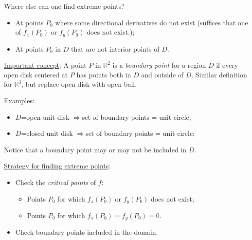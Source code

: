 \begin{frame}
  \frametitle{}

Where else can one find extreme points?\pause

\begin{itemize}
  \item At points $P_0$ where some directional derivatives do not exist (suffices that one of $f_x(P_0)$ or $f_y(P_0)$ does not exist.);
  \item At points $P_0$ in $D$ that are not interior points of $D$.
\end{itemize}

\pause
\underline{Important concept}: A point $P$ in $\mathbb{R}^2$ is a \emph{boundary point} for a region $D$ if every open disk centered at $P$ has points both in $D$ and outside of $D$. Similar definition for $\mathbb{R}^3$, but replace open disk with open ball.

\pause
Examples:
\begin{itemize}
  \item $D$=open unit disk $\Longrightarrow$\pause set of boundary points = unit circle;\pause
  \item $D$=closed unit disk $\Longrightarrow$\pause set of boundary points = unit circle;\pause
\end{itemize}
%
Notice that a boundary point may or may not be included in $D$.

\pause
\underline{Strategy for finding extreme points}:
%
\begin{itemize}
  \item Check the \emph{critical points} of $f$:
  \begin{itemize}
    \item Points $P_0$ for which $f_x(P_0)$ or $f_y(P_0)$ does not exist;
    \item Points $P_0$ for which $f_x(P_0)=f_y(P_0)=0$.
  \end{itemize}
  \item Check boundary points included in the domain.
\end{itemize}
\end{frame}

